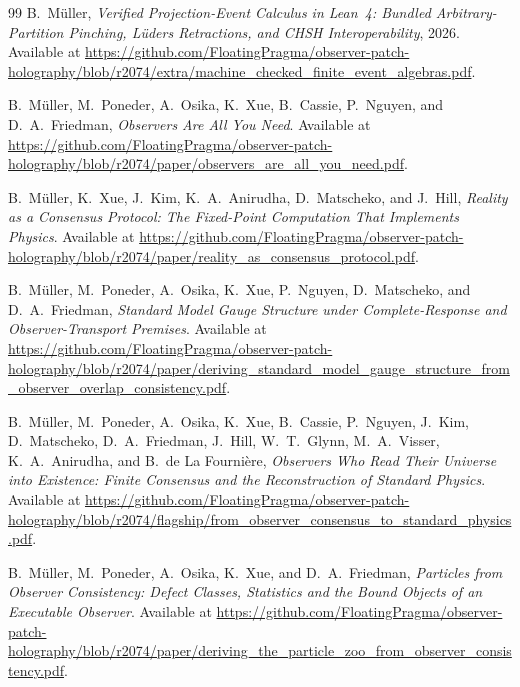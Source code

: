 \documentclass[11pt]{article}
\theoremstyle{remark}
\theoremstyle{plain}
\begin{document}
\begin{thebibliography}{99}
B.\ M\"uller,
\emph{Verified Projection-Event Calculus in Lean~4: Bundled Arbitrary-Partition Pinching,
L\"uders Retractions, and CHSH Interoperability},
2026.\\
Available at \url{https://github.com/FloatingPragma/observer-patch-holography/blob/r2074/extra/machine_checked_finite_event_algebras.pdf}.

B.\ M\"uller, M.\ Poneder, A.\ Osika, K.\ Xue, B.\ Cassie, P.\ Nguyen, and D.\ A.\ Friedman,
\emph{Observers Are All You Need}.
Available at \url{https://github.com/FloatingPragma/observer-patch-holography/blob/r2074/paper/observers_are_all_you_need.pdf}.

B.\ M\"uller, K.\ Xue, J.\ Kim, K.\ A.\ Anirudha, D.\ Matscheko, and J.\ Hill,
\emph{Reality as a Consensus Protocol: The Fixed-Point Computation That Implements Physics}.
Available at \url{https://github.com/FloatingPragma/observer-patch-holography/blob/r2074/paper/reality_as_consensus_protocol.pdf}.

B.\ M\"uller, M.\ Poneder, A.\ Osika, K.\ Xue, P.\ Nguyen, D.\ Matscheko, and D.\ A.\ Friedman,
\emph{Standard Model Gauge Structure under Complete-Response and Observer-Transport Premises}.
Available at \url{https://github.com/FloatingPragma/observer-patch-holography/blob/r2074/paper/deriving_standard_model_gauge_structure_from_observer_overlap_consistency.pdf}.

B.\ M\"uller, M.\ Poneder, A.\ Osika, K.\ Xue, B.\ Cassie, P.\ Nguyen, J.\ Kim, D.\ Matscheko, D.\ A.\ Friedman, J.\ Hill, W.\ T.\ Glynn, M.\ A.\ Visser, K.\ A.\ Anirudha, and B.\ de La Fourni\`ere,
\emph{Observers Who Read Their Universe into Existence: Finite Consensus and the Reconstruction of Standard Physics}.
Available at \url{https://github.com/FloatingPragma/observer-patch-holography/blob/r2074/flagship/from_observer_consensus_to_standard_physics.pdf}.

B.\ M\"uller, M.\ Poneder, A.\ Osika, K.\ Xue, and D.\ A.\ Friedman,
\emph{Particles from Observer Consistency: Defect Classes, Statistics and the Bound Objects of an Executable Observer}.
Available at \url{https://github.com/FloatingPragma/observer-patch-holography/blob/r2074/paper/deriving_the_particle_zoo_from_observer_consistency.pdf}.


\end{thebibliography}
\end{document}

